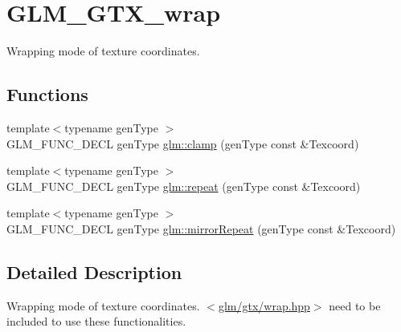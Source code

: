 \hypertarget{group__gtx__wrap}{\section{G\-L\-M\-\_\-\-G\-T\-X\-\_\-wrap}
\label{group__gtx__wrap}
}


Wrapping mode of texture coordinates.  


\subsection*{Functions}
\begin{DoxyCompactItemize}
\item 
{\footnotesize template$<$typename gen\-Type $>$ }\\G\-L\-M\-\_\-\-F\-U\-N\-C\-\_\-\-D\-E\-C\-L gen\-Type \hyperlink{group__gtx__wrap_ga6c0cc6bd1d67ea1008d2592e998bad33}{glm\-::clamp} (gen\-Type const \&Texcoord)
\item 
{\footnotesize template$<$typename gen\-Type $>$ }\\G\-L\-M\-\_\-\-F\-U\-N\-C\-\_\-\-D\-E\-C\-L gen\-Type \hyperlink{group__gtx__wrap_ga809650c6310ea7c42666e918c117fb6f}{glm\-::repeat} (gen\-Type const \&Texcoord)
\item 
{\footnotesize template$<$typename gen\-Type $>$ }\\G\-L\-M\-\_\-\-F\-U\-N\-C\-\_\-\-D\-E\-C\-L gen\-Type \hyperlink{group__gtx__wrap_ga16a89b0661b60d5bea85137bbae74d73}{glm\-::mirror\-Repeat} (gen\-Type const \&Texcoord)
\end{DoxyCompactItemize}


\subsection{Detailed Description}
Wrapping mode of texture coordinates. $<$\hyperlink{wrap_8hpp}{glm/gtx/wrap.\-hpp}$>$ need to be included to use these functionalities. 

